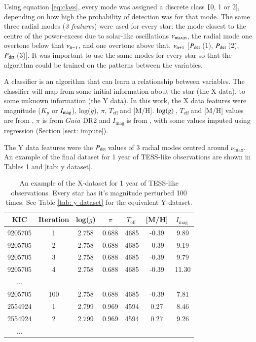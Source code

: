 \documentclass[a4paper,fleqn,usenatbib,useAMS]{mnras}
\newcommand{\numax}{\ensuremath{\nu_{\textrm{max}}}}
\newcommand{\teff}{\ensuremath{T_{\textrm{eff}}\:}}
\newcommand{\pdet}{\ensuremath{P_{\rm det}\:}}
\newcommand{\imag}{\ensuremath{I_{\textrm{mag}}\:}}
\newcommand{\logg}{\ensuremath{{\rm log}(g)\:}}
\begin{document}
Using equation \ref{eq:class}, every mode was assigned a discrete class {\texttt [0, 1 or 2]}, depending on how high the probability of detection was for that mode. The same three radial modes ({\it 3 features}) were used for every star: the mode closest to the centre of the power-excess due to solar-like oscillations $\nu_{\rm max; n}$, the radial mode one overtone below that $\nu_{\rm n-1}$, and one overtone above that, $\nu_{\rm n+1}$ [\pdet(1), \pdet(2), \pdet(3)]. It was important to use the same modes for every star so that the algorithm could be trained on the patterns between the variables.

A classifier is an algorithm that can learn a relationship between variables. The classifier will map from some initial information about the star (the X data), to some unknown information (the Y data). In this work, the X data features were magnitude ($K_{p}$ or $I_{\rm mag}$), log($g$), $\pi$, \teff and [M/H]. \logg, \teff and [M/H] values are from \citet{pinsonneault_apokasc_2014}, $\pi$ is from $Gaia$ DR2 \citet{lindegren_gaia_2018} and \imag is from \citet{hog_tycho-2_2000}, with some values imputed using regression (Section \ref{sect: impute}).

The Y data features were the \pdet values of 3 radial modes centred around \numax. An example of the final dataset for 1 year of TESS-like observations are shown in Tables \ref{tab: x dataset} and \ref{tab: y dataset}.


\begin{table}
\begin{center}
\begin{tabular}{|*{7}{c|}}
KIC     & Iteration & log($g$) & $\pi$ & \teff & [M/H] & \imag \\
\hline
9205705	& 1         & 2.758	& 0.688 & 4685 & -0.39 & 9.89  \\
9205705	& 2         & 2.758	& 0.688 & 4685 & -0.39 & 9.19  \\
9205705	& 3         & 2.758	& 0.688 & 4685 & -0.39 & 9.79  \\
9205705	& 4         & 2.758	& 0.688 & 4685 & -0.39 & 11.30 \\
...                                                        \\
9205705	& 100       & 2.758	& 0.688 & 4685 & -0.39 & 7.81  \\
2554924	& 1	        & 2.799	& 0.969 & 4594 &  0.27 & 8.46  \\
2554924	& 2         & 2.799	& 0.969 & 4594 &  0.27 & 9.26  \\
...                                                         \\
\hline
\end{tabular}
\end{center}
\caption{An example of the X-dataset for 1 year of TESS-like observations. Every star has it's magnitude perturbed 100 times. See Table \ref{tab: y dataset} for the equivalent Y-dataset.}
\label{tab: x dataset}
\end{table}
\end{document}
